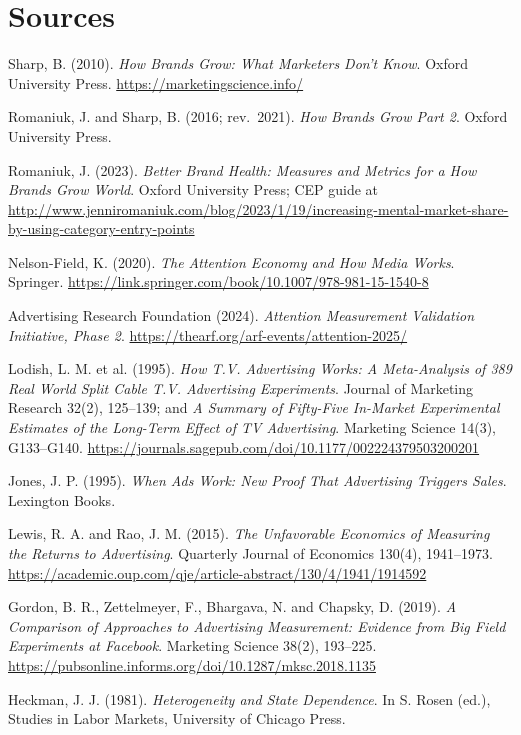 \section*{Sources}
\begingroup\raggedright
\begin{enumerate}[label={[\arabic*]},leftmargin=2.5em]
\item Sharp, B. (2010). \emph{How Brands Grow: What Marketers Don't Know}. Oxford University Press. \url{https://marketingscience.info/}
\item Romaniuk, J. and Sharp, B. (2016; rev.\ 2021). \emph{How Brands Grow Part 2}. Oxford University Press.
\item Romaniuk, J. (2023). \emph{Better Brand Health: Measures and Metrics for a How Brands Grow World}. Oxford University Press; CEP guide at \url{http://www.jenniromaniuk.com/blog/2023/1/19/increasing-mental-market-share-by-using-category-entry-points}
\item Nelson-Field, K. (2020). \emph{The Attention Economy and How Media Works}. Springer. \url{https://link.springer.com/book/10.1007/978-981-15-1540-8}
\item Advertising Research Foundation (2024). \emph{Attention Measurement Validation Initiative, Phase 2}. \url{https://thearf.org/arf-events/attention-2025/}
\item Lodish, L. M. et al. (1995). \emph{How T.V. Advertising Works: A Meta-Analysis of 389 Real World Split Cable T.V. Advertising Experiments}. Journal of Marketing Research 32(2), 125--139; and \emph{A Summary of Fifty-Five In-Market Experimental Estimates of the Long-Term Effect of TV Advertising}. Marketing Science 14(3), G133--G140. \url{https://journals.sagepub.com/doi/10.1177/002224379503200201}
\item Jones, J. P. (1995). \emph{When Ads Work: New Proof That Advertising Triggers Sales}. Lexington Books.
\item Lewis, R. A. and Rao, J. M. (2015). \emph{The Unfavorable Economics of Measuring the Returns to Advertising}. Quarterly Journal of Economics 130(4), 1941--1973. \url{https://academic.oup.com/qje/article-abstract/130/4/1941/1914592}
\item Gordon, B. R., Zettelmeyer, F., Bhargava, N. and Chapsky, D. (2019). \emph{A Comparison of Approaches to Advertising Measurement: Evidence from Big Field Experiments at Facebook}. Marketing Science 38(2), 193--225. \url{https://pubsonline.informs.org/doi/10.1287/mksc.2018.1135}
\item Heckman, J. J. (1981). \emph{Heterogeneity and State Dependence}. In S. Rosen (ed.), Studies in Labor Markets, University of Chicago Press.

\end{enumerate}
